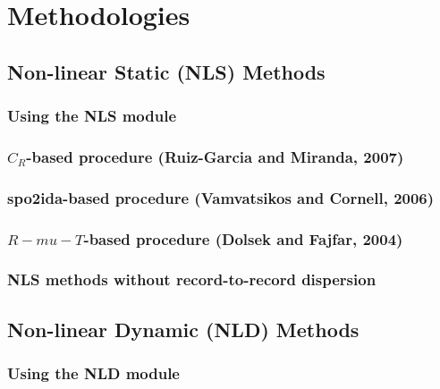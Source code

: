 \chapter{Methodologies}
\label{chap:methodologies}


	\section{Non-linear Static (NLS) Methods}
	\label{sec:nls-intro}
	

		\subsection{Using the NLS module}
		\label{subsec:nls-how-to-use}
		

		\subsection{$C_R$-based procedure (Ruiz-Garcia and Miranda, 2007)}
		\label{subsec:nls-ruiz-garcia-miranda}
		

		\subsection{spo2ida-based procedure (Vamvatsikos and Cornell, 2006)}
		\label{subsec:nls-spo2ida}
		

		\subsection{$R-mu-T$-based procedure (Dolsek and Fajfar, 2004)}
		\label{subsec:nls-dolsek-fajfar}
		

		\subsection{NLS methods without record-to-record dispersion}
		\label{subsec:nls-no-dispersion}
		

	\section{Non-linear Dynamic (NLD) Methods}
	\label{sec:nld-intro}
	

		\subsection{Using the NLD module}
		\label{subsec:nld-how-to-use}


